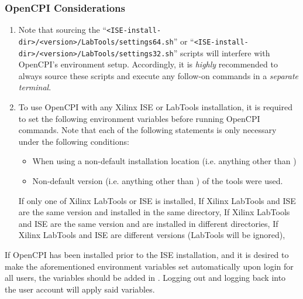 \begin{flushleft}
\begin{flushleft}
\subsubsection{OpenCPI Considerations}
\label{sec:iseav}
\begin{enumerate}
\item Note that sourcing the ``\verb+<ISE-install-dir>/<version>/LabTools/settings64.sh+'' or ``\verb+<ISE-install-dir>/<version>/LabTools/settings32.sh+'' scripts will interfere with OpenCPI's environment setup. Accordingly, it is \textit{highly } recommended to always source these scripts and execute any follow-on commands in a \textit{separate terminal}.
\item To use OpenCPI with any Xilinx ISE or LabTools installation,  it is required to set the following environment variables before running OpenCPI commands. Note that each of the following  statements is only necessary under the following conditions:
\begin{itemize}
\item When using a non-default installation location (i.e. anything other than )
\item Non-default version (i.e. anything other than ) of the tools were used.
\end{itemize}

\subitem If only one of Xilinx LabTools or ISE is installed,
\subsubitem {}
\subsubitem {}
\subitem If Xilinx LabTools and ISE are the same version and installed in the same directory,
\subsubitem {}
\subsubitem {}
\subitem If Xilinx LabTools and ISE are the same version and are installed in different directories,
\subsubitem {}
\subsubitem {}
\subsubitem {}
\subitem If Xilinx LabTools and ISE are different versions (LabTools will be ignored),
\subsubitem {}
\subsubitem {}
\end{enumerate}

If OpenCPI has been installed prior to the ISE installation, and it is desired to make the aforementioned environment variables set automatically upon login for all users, the variables should be added in . Logging out and logging back into the user account will apply said variables.
\end{flushleft}


\end{flushleft}
